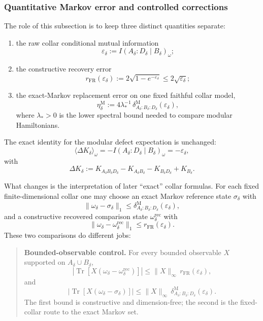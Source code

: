 \subsubsection{Quantitative Markov error and controlled corrections}\label{59-quantitative-markov-error-and-controlled-corrections}

The role of this subsection is to keep three distinct quantities separate:

\begin{enumerate}
\def\labelenumi{\arabic{enumi}.}
\tightlist
\item
the raw collar conditional mutual information
\[
\varepsilon_\delta:=I(A_\delta:D_\delta\mid B_\delta)_\omega;
\]
\item
the constructive recovery error
\[
r_{\mathrm{FR}}(\varepsilon_\delta)
:=
2\sqrt{1-e^{-\varepsilon_\delta}}
\le
2\sqrt{\varepsilon_\delta};
\]
\item
the exact-Markov replacement error on one fixed faithful collar model,
\[
\eta_\delta^{\mathrm M}
:=
4\lambda_\ast^{-1}\,
\delta^{\mathrm M}_{A_\delta:B_\delta:D_\delta}(\varepsilon_\delta),
\]
where \(\lambda_\ast>0\) is the lower spectral bound needed to compare modular Hamiltonians.
\end{enumerate}

The exact identity for the modular defect expectation is unchanged:
\[
\langle \Delta K_\delta\rangle_\omega
=
-I(A_\delta:D_\delta\mid B_\delta)_\omega
=
-\varepsilon_\delta,
\]
with
\[
\Delta K_\delta
:=
K_{A_\delta B_\delta D_\delta}
-K_{A_\delta B_\delta}
-K_{B_\delta D_\delta}
+K_{B_\delta}.
\]

What changes is the interpretation of later ``exact'' collar formulas. For each fixed finite-dimensional collar one may choose an exact Markov reference state \(\sigma_\delta\) with
\[
\|\omega_\delta-\sigma_\delta\|_1
\le
\delta^{\mathrm M}_{A_\delta:B_\delta:D_\delta}(\varepsilon_\delta),
\]
and a constructive recovered comparison state \(\omega_\delta^{\mathrm{rec}}\) with
\[
\|\omega_\delta-\omega_\delta^{\mathrm{rec}}\|_1
\le
r_{\mathrm{FR}}(\varepsilon_\delta).
\]
These two comparisons do different jobs:

\begin{quote}
\textbf{Bounded-observable control.} For every bounded observable \(X\) supported on \(A_\delta\cup B_\delta\),
\[
\left|
\operatorname{Tr}\!\left[X(\omega_\delta-\omega_\delta^{\mathrm{rec}})\right]
\right|
\le
\|X\|_\infty\,r_{\mathrm{FR}}(\varepsilon_\delta),
\]
and
\[
\left|
\operatorname{Tr}\!\left[X(\omega_\delta-\sigma_\delta)\right]
\right|
\le
\|X\|_\infty\,
\delta^{\mathrm M}_{A_\delta:B_\delta:D_\delta}(\varepsilon_\delta).
\]
The first bound is constructive and dimension-free; the second is the fixed-collar route to the exact Markov set.
\end{quote}

